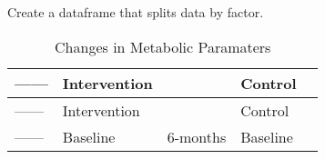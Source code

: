 \documentclass[]{article}
\begin{document}
Create a dataframe that splits data by factor.

\begin{longtable}[]{@{}lllll@{}}
\caption{Changes in Metabolic Paramaters}\tabularnewline
\toprule
\begin{minipage}[b]{0.15\columnwidth}\raggedright
------\strut
\end{minipage} & \begin{minipage}[b]{0.20\columnwidth}\raggedright
Intervention\strut
\end{minipage} & \begin{minipage}[b]{0.18\columnwidth}\raggedright
\strut
\end{minipage} & \begin{minipage}[b]{0.18\columnwidth}\raggedright
Control\strut
\end{minipage} & \begin{minipage}[b]{0.15\columnwidth}\raggedright
\strut
\end{minipage}\tabularnewline
\midrule
\endfirsthead
\toprule
\begin{minipage}[b]{0.15\columnwidth}\raggedright
------\strut
\end{minipage} & \begin{minipage}[b]{0.20\columnwidth}\raggedright
Intervention\strut
\end{minipage} & \begin{minipage}[b]{0.18\columnwidth}\raggedright
\strut
\end{minipage} & \begin{minipage}[b]{0.18\columnwidth}\raggedright
Control\strut
\end{minipage} & \begin{minipage}[b]{0.15\columnwidth}\raggedright
\strut
\end{minipage}\tabularnewline
\midrule
\endhead
\begin{minipage}[t]{0.15\columnwidth}\raggedright
------\strut
\end{minipage} & \begin{minipage}[t]{0.20\columnwidth}\raggedright
Baseline\strut
\end{minipage} & \begin{minipage}[t]{0.18\columnwidth}\raggedright
6-months\strut
\end{minipage} & \begin{minipage}[t]{0.18\columnwidth}\raggedright
Baseline\strut
\end{minipage} & \begin{minipage}[t]{0.15\columnwidth}\raggedright

\end{minipage}
\end{longtable}
\end{document}
